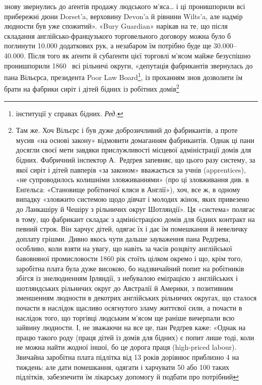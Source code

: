 знову звернулись до аґентів продажу людського м’яса\dots{} і ці пронишпорили
всі прибережні дюни Dorset’a, верховину Devon’a
й рівнини Wilts’a, але надмір людности був уже спожитий».
«Bury Guardian» нарікав на те, що після складання англійсько-французького
торговельного договору можна було б поглинути
\num{10.000} додаткових рук, а незабаром їм потрібно буде ще \num{30.000}--\num{40.000}.
Після того як аґенти й субаґенти цієї торговлі м’ясом
майже безуспішно пронишпорили 1860~ всі рільничі округи,
«депутація фабрикантів звернулась до пана Вільєрса, президента
Poor Law Board\footnote*{
інституції у справах бідних. \emph{Ред.}
}, із проханням знов дозволити їм брати на
фабрики сиріт і дітей бідних із робітних домів\footnote{
Там же. Хоч Вільєрс і був дуже доброзичливий до фабрикантів,
а проте мусив «на основі закону» відмовити домаганням фабрикантів.
Однак ці пани досягли своєї мети завдяки прислужливості місцевої
адміністрації домів для бідних. Фабричний інспектор А.~Редґрев запевняє,
що цього разу систему, за якої сиріт і дітей павперів «за законом» вважається
за учнів (apprentices), «не супроводилось колишніми зловживаннями»
(про ці зловживання див. в Енґельса: «Становище робітничої
кляси в Англії»), хоч, все ж, в одному випадку «зловжито системою щодо
дівчат і молодих жінок, яких привезено до Ланкашіру й Чешіру з рільничих
округ Шотляндії». Ця «система» полягає в тому, що фабрикант складає
з адміністрацією домів для бідних контракт на певний строк. Він харчує
дітей, одягає їх і дає їм помешкання й невеличку доплату грішми.
Дивно якось чути дальше зауваження пана Редґрева, особливо, коли взяти
на увагу, що навіть за часів розцвіту англійської бавовняної промисловости
1860 рік стоїть цілком окремо і що, крім того, заробітна плата була
дуже високою, бо надзвичайний попит на робітників збігся із знелюдненням
Ірляндії, з небувалою еміґрацією з англійських і шотляндських
рільничих округ до Австралії й Америки, з позитивним зменшенням людности
в декотрих англійських рільничих округах, що сталося почасти в
наслідок щасливо осягнутого зламу життєвої сили, а почасти в наслідок
того, що торгівці людським м’ясом ще раніше вичерпали всю зайвину
людности. І, не зважаючи на все це, пан Редґрев каже: «Однак на працю
такого роду (праця дітей із домів для бідних) є попит лише тоді, коли не
можна найти жодної іншої, бо це дорога праця (high-priced labour).
Звичайна заробітна плата підлітка від 13 років дорівнює приблизно 4
на тиждень: але дати помешкання, одягати і харчувати 50 або 100
таких підлітків, забезпечити їм лікарську допомогу й подбати про потрібний
}
